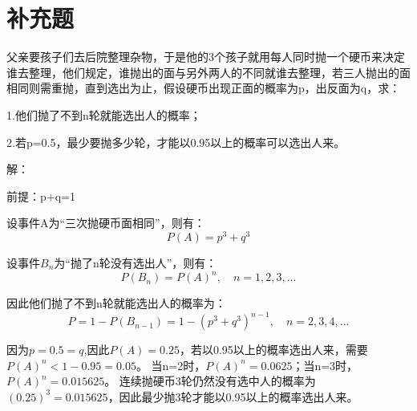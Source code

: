\documentclass{article}
\begin{document}
\section{补充题}
父亲要孩子们去后院整理杂物，于是他的3个孩子就用每人同时抛一个硬币来决定谁去整理，他们规定，谁抛出的面与另外两人的不同就谁去整理，若三人抛出的面相同则需重抛，直到选出为止，假设硬币出现正面的概率为p，出反面为q，求：

1.他们抛了不到n轮就能选出人的概率；

2.若p=0.5，最少要抛多少轮，才能以0.95以上的概率可以选出人来。

解：

前提：p+q=1

设事件A为“三次抛硬币面相同”，则有：
$$P(A)=p^3+q^3$$

设事件$B_n$为“抛了n轮没有选出人”，则有：
$$P(B_n)=P(A)^{n},\quad n=1,2,3,...$$

因此他们抛了不到n轮就能选出人的概率为：
$$P=1-P(B_{n-1})=1-(p^3+q^3)^{n-1}, \quad n=2,3,4,...$$ 

因为$p=0.5=q$,因此$P(A)=0.25$，若以0.95以上的概率选出人来，需要$P(A)^n<1-0.95=0.05$。
当n=2时，$P(A)^n=0.0625$；当n=3时，$P(A)^n=0.015625$。
连续抛硬币3轮仍然没有选中人的概率为$(0.25)^3=0.015625$，因此最少抛3轮才能以0.95以上的概率选出人来。
\end{document}
